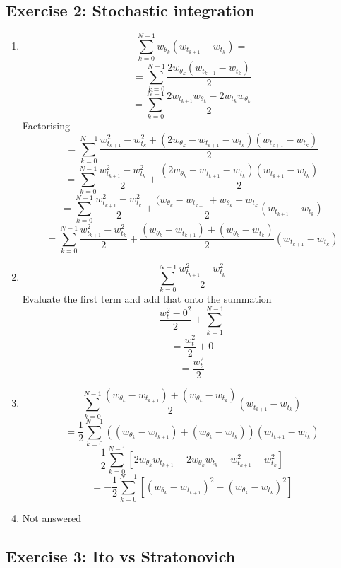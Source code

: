 \documentclass[10pt,a4paper,oneside]{article}
\begin{document}
    \subsection*{Exercise 2: Stochastic integration}
    \begin{enumerate}
        \item $$\sum_{k=0}^{N-1}w_{\theta_k}(w_{t_{k+1}}-w_{t_k}) = $$
    $$ = \sum_{k=0}^{N-1} \frac{2w_{\theta_k}(w_{t_{k+1}}-w_{t_k})}{2} $$
    $$ = \sum_{k=0}^{N-1} \frac{2w_{t_{k+1}}w_{\theta_k}-2w_{t_k}w_{\theta_k}}{2}$$
    Factorising 
    $$ = \sum_{k=0}^{N-1} \frac{w_{t_{k+1}}^2 - w_{t_k}^2+ (2w_{\theta_k} - w_{t_{k+1}} - w_{t_k} ) ( w_{t_{k+1}} - w_{t_k})}{2}$$
    $$ = \sum_{k=0}^{N-1} \frac{w_{t_{k+1}}^2 - w_{t_k}^2}{2} + \frac{(2w_{\theta_k} - w_{t_{k+1}} - w_{t_k} ) ( w_{t_{k+1}} - w_{t_k})}{2} $$
    $$  = \sum_{k=0}^{N-1}  \frac{w_{t_{k+1}}^2 - w_{t_k}^2}{2}+ \frac{(w_{\theta_k} - w_{t_{k+1}} + w_{\theta_k}-w_{t_k}}{2} ( w_{t_{k+1}} - w_{t_k}) $$
    $$  = \sum_{k=0}^{N-1} \frac{w_{t_{k+1}}^2 - w_{t_k}^2}{2} +  \frac{(w_{\theta_k} - w_{t_{k+1}}) + (w_{\theta_k}-w_{t_k})}{2} ( w_{t_{k+1}} - w_{t_k}) $$
    
    \item $$ \sum_{k=0}^{N-1} \frac{w_{t_{k+1}}^2 - w_{t_k}^2}{2} $$
    Evaluate the first term and add that onto the summation
    $$ \frac{w_t^2 - 0^2}{2} + \sum_{k=1}^{N-1} $$
    $$ = \frac{w_t^2}{2} + 0 $$ 
    $$ = \frac{w_t^2}{2} $$

    \item $$ \sum_{k=0}^{N-1}\frac{(w_{\theta_{k}}-w_{t_{k+1}})+(w_{\theta_k}-w_{t_k})}{2}(w_{t_{k+1}}-w_{t_k}) $$
    $$ = \frac{1}{2} \sum_{k=0}^{N-1} ((w_{\theta_k} - w_{t_{k+1}}) + (w_{\theta_k}- w_{t_k})) ( w_{t_{k+1}}- w_{t_k}) $$
    $$ \frac{1}{2} \sum_{k=0}^{N-1} [2w_{\theta_k}w_{t_{k+1}} - 2w_{\theta_k}w_{t_k} - w_{t_{k+1}}^2 + w_{t_k}^2]$$
    $$  =-\frac{1}{2}\sum_{k=0}^{N-1}[(w_{\theta_{k}}-w_{t_{k+1}})^2-(w_{\theta_k}-w_{t_k})^2] $$
    
    \item Not answered
    


    \end{enumerate}
    
    \subsection*{Exercise 3: Ito vs Stratonovich}
\end{document}
